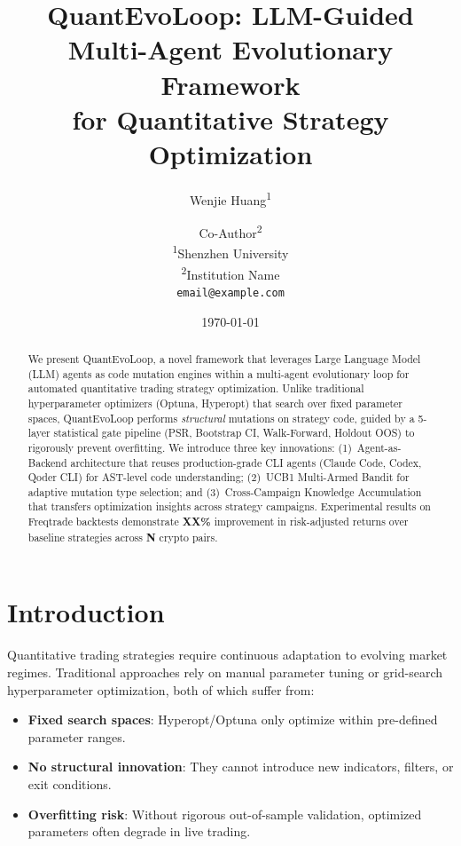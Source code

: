 \documentclass[11pt,a4paper]{article}
\title{QuantEvoLoop: LLM-Guided Multi-Agent Evolutionary Framework\\
       for Quantitative Strategy Optimization}
\author{
  Wenjie Huang\textsuperscript{1} \and
  Co-Author\textsuperscript{2} \\[0.5em]
  \textsuperscript{1}Shenzhen University \\
  \textsuperscript{2}Institution Name \\
  \texttt{email@example.com}
}
\date{\today}
\begin{document}
\maketitle

\begin{abstract}
We present QuantEvoLoop, a novel framework that leverages Large Language Model
(LLM) agents as code mutation engines within a multi-agent evolutionary loop
for automated quantitative trading strategy optimization. Unlike traditional
hyperparameter optimizers (Optuna, Hyperopt) that search over fixed parameter
spaces, QuantEvoLoop performs \emph{structural} mutations on strategy code,
guided by a 5-layer statistical gate pipeline (PSR, Bootstrap CI, Walk-Forward,
Holdout OOS) to rigorously prevent overfitting. We introduce three key
innovations: (1)~Agent-as-Backend architecture that reuses production-grade
CLI agents (Claude Code, Codex, Qoder CLI) for AST-level code understanding;
(2)~UCB1 Multi-Armed Bandit for adaptive mutation type selection; and
(3)~Cross-Campaign Knowledge Accumulation that transfers optimization insights
across strategy campaigns. Experimental results on Freqtrade backtests
demonstrate \textbf{XX\%} improvement in risk-adjusted returns over baseline
strategies across \textbf{N} crypto pairs.
\end{abstract}

\section{Introduction}
\label{sec:intro}

Quantitative trading strategies require continuous adaptation to evolving
market regimes. Traditional approaches rely on manual parameter tuning or
grid-search hyperparameter optimization, both of which suffer from:
\begin{itemize}
  \item \textbf{Fixed search spaces}: Hyperopt/Optuna only optimize within
        pre-defined parameter ranges.
  \item \textbf{No structural innovation}: They cannot introduce new indicators,
        filters, or exit conditions.
  \item \textbf{Overfitting risk}: Without rigorous out-of-sample validation,
        optimized parameters often degrade in live trading.
\end{itemize}
\end{document}
